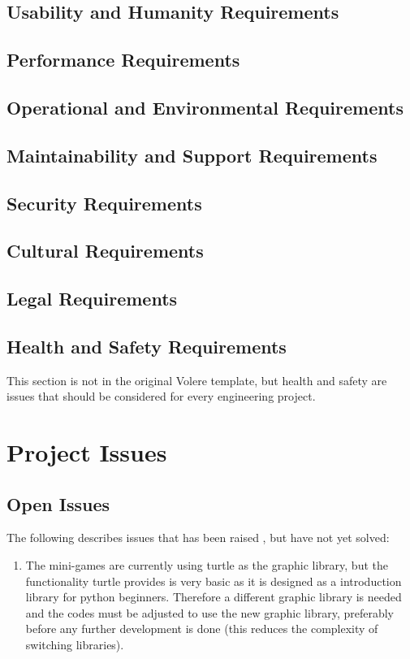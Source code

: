 \documentclass[12pt, titlepage]{article}
\begin{document}
\subsection{Usability and Humanity Requirements}

\subsection{Performance Requirements}

\subsection{Operational and Environmental Requirements}

\subsection{Maintainability and Support Requirements}

\subsection{Security Requirements}

\subsection{Cultural Requirements}

\subsection{Legal Requirements}

\subsection{Health and Safety Requirements}

This section is not in the original Volere template, but health and safety are
issues that should be considered for every engineering project.

\section{Project Issues}

\subsection{Open Issues}

The following describes issues that has been raised , but have not yet solved:
\begin{enumerate}
    \item The mini-games are currently using turtle as the graphic library, but the functionality turtle provides is very basic as it is designed as a introduction library for python beginners. Therefore a different graphic library is needed and the codes must be adjusted to use the new graphic library, preferably before any further development is done (this reduces the complexity of switching libraries).
\end{enumerate}
\end{document}
